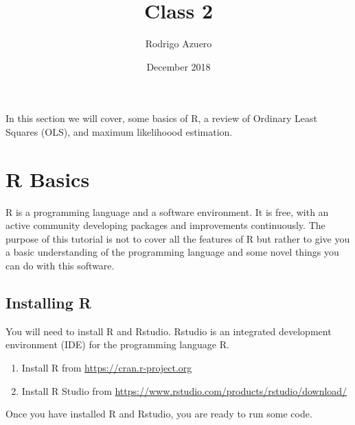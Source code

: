 \documentclass{article}
\title{Class 2}
\author{Rodrigo Azuero }
\date{December 2018}
\begin{document}
\maketitle
In this section we will cover, some basics of R, a review of Ordinary Least Squares (OLS), and maximum likelihoood estimation.


\section{R Basics}
R is a programming language and a software environment. It is free, with an active community developing packages and improvements continuously. The purpose of this tutorial is not to cover all the features of R but rather to give you a basic understanding of the programming language and some novel things you can do with this software. 
\subsection{Installing R}
You will need to install R and Rstudio. Rstudio is an integrated development environment (IDE) for the programming language R. 
\begin{enumerate}
    \item Install R from \href{https://cran.r-project.org/}{https://cran.r-project.org}
    \item Install R Studio from \href{https://www.rstudio.com/products/rstudio/download/}{https://www.rstudio.com/products/rstudio/download/}
\end{enumerate}
Once you have installed R and Rstudio, you are ready to run some code. 
\end{document}
